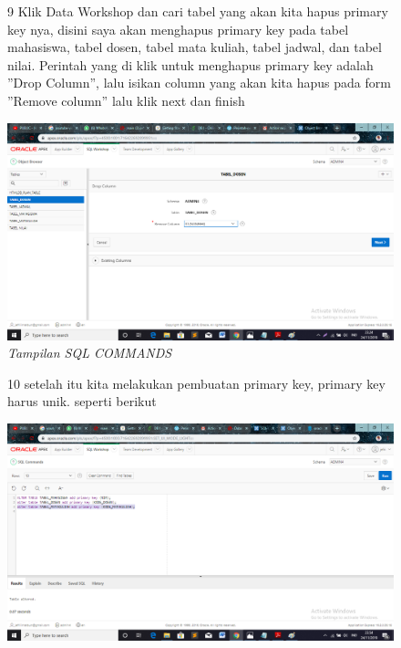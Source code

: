 \begin{enumerate}
\begin{figure}
\item[9]Klik Data Workshop dan cari tabel yang akan kita hapus primary key nya,
disini saya akan menghapus primary key pada tabel mahasiswa, tabel dosen, tabel
mata kuliah, tabel jadwal, dan tabel nilai. Perintah yang di klik untuk menghapus
primary key adalah ”Drop Column”, lalu isikan column yang akan kita hapus
pada form ”Remove column” lalu klik next dan finish
    \begin{center}
\includegraphics[scale=0.4]{apex/ss15.png}
    \caption{\textit{Tampilan SQL COMMANDS}}
        \end{center}
\label{gambar}
\end{figure}


\begin{figure}
\item[10]setelah itu kita melakukan pembuatan primary key, primary key harus unik. seperti berikut
    \begin{center}
\includegraphics[scale=0.4]{apex/ss16.png}
    \caption{\textit{}}
        \end{center}
\label{gambar}
\end{figure}
\begin{figure}


\end{figure}
\end{enumerate}
